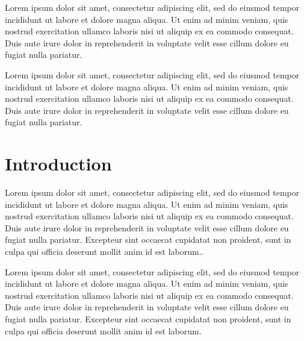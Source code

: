 \documentclass[12pt,a4paper]{article}
\begin{document}
Lorem ipsum dolor sit amet, consectetur adipiscing elit, sed do eiusmod
tempor incididunt ut labore et dolore magna aliqua. Ut enim ad minim
veniam, quis nostrud exercitation ullamco laboris nisi ut aliquip ex ea
commodo consequat. Duis aute irure dolor in reprehenderit in voluptate
velit esse cillum dolore eu fugiat nulla pariatur.

Lorem ipsum dolor sit amet, consectetur adipiscing elit, sed do eiusmod
tempor incididunt ut labore et dolore magna aliqua. Ut enim ad minim
veniam, quis nostrud exercitation ullamco laboris nisi ut aliquip ex ea
commodo consequat. Duis aute irure dolor in reprehenderit in voluptate
velit esse cillum dolore eu fugiat nulla pariatur.


\newpage

\centering
\raggedright
\newpage
\tableofcontents

\newpage



\setlength{\parindent}{0pt}   %
\setlength{\parskip}{3ex}     %


\hypertarget{introduction}{%
\section{Introduction}\label{introduction}}

Lorem ipsum dolor sit amet, consectetur adipiscing elit, sed do eiusmod
tempor incididunt ut labore et dolore magna aliqua. Ut enim ad minim
veniam, quis nostrud exercitation ullamco laboris nisi ut aliquip ex ea
commodo consequat. Duis aute irure dolor in reprehenderit in voluptate
velit esse cillum dolore eu fugiat nulla pariatur. Excepteur sint
occaecat cupidatat non proident, sunt in culpa qui officia deserunt
mollit anim id est laborum..

Lorem ipsum dolor sit amet, consectetur adipiscing elit, sed do eiusmod
tempor incididunt ut labore et dolore magna aliqua. Ut enim ad minim
veniam, quis nostrud exercitation ullamco laboris nisi ut aliquip ex ea
commodo consequat. Duis aute irure dolor in reprehenderit in voluptate
velit esse cillum dolore eu fugiat nulla pariatur. Excepteur sint
occaecat cupidatat non proident, sunt in culpa qui officia deserunt
mollit anim id est laborum.
\end{document}
